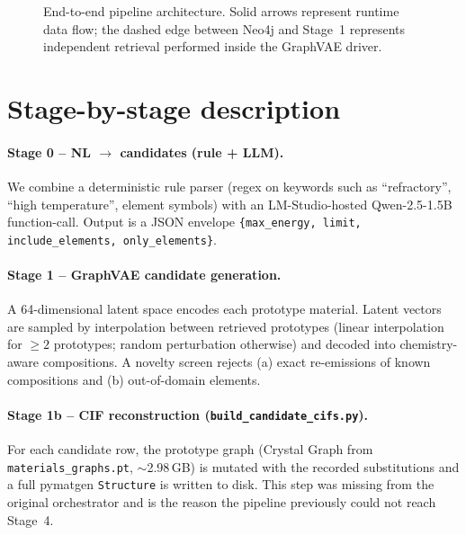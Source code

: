 \documentclass[11pt,a4paper]{report}
\begin{document}
\begin{figure}[h]
\caption{End-to-end pipeline architecture. Solid arrows represent runtime data flow;
  the dashed edge between Neo4j and Stage~1 represents independent retrieval performed
  inside the GraphVAE driver.}
\label{fig:architecture}
\end{figure}

\section{Stage-by-stage description}

\paragraph{Stage 0 -- NL $\to$ candidates (rule + LLM).}
We combine a deterministic rule parser (regex on keywords such as ``refractory'', ``high
temperature'', element symbols) with an LM-Studio-hosted Qwen-2.5-1.5B function-call. Output
is a JSON envelope \texttt{\{max\_energy, limit, include\_elements, only\_elements\}}.

\paragraph{Stage 1 -- GraphVAE candidate generation.}
A 64-dimensional latent space encodes each prototype material. Latent vectors are sampled by
interpolation between retrieved prototypes (linear interpolation for $\geq 2$ prototypes;
random perturbation otherwise) and decoded into chemistry-aware compositions. A novelty
screen rejects (a) exact re-emissions of known compositions and (b) out-of-domain elements.

\paragraph{Stage 1b -- CIF reconstruction (\texttt{build\_candidate\_cifs.py}).}
For each candidate row, the prototype graph (Crystal Graph from
\texttt{materials\_graphs.pt}, $\sim$2.98\,GB) is mutated with the recorded substitutions
and a full pymatgen \texttt{Structure} is written to disk. This step was missing from the
original orchestrator and is the reason the pipeline previously could not reach Stage~4.
\end{document}
